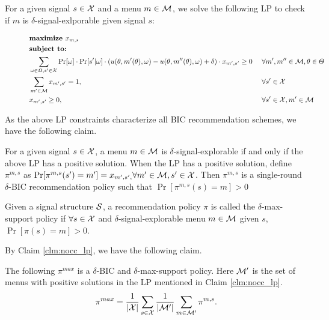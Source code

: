 For a given signal $s \in \X$ and a menu $m \in \M$, we solve the following LP to check if $m$ is $\delta$-signal-exlporable given signal $s$:

\begin{figure}[H]
\begin{mdframed}
\begin{alignat*}{2}
 & \textbf{maximize }    x_{m,s}\  \\
&  \textbf{subject to: }\\
 & \sum_{\omega \in \varOmega, s' \in \X} \Pr[\omega] \cdot \Pr[s' | \omega] \cdot \left(u(\theta, m'(\theta), \omega) - u(\theta, m''(\theta), \omega) + \delta\right) \cdot x_{m',s'} \geq 0  &\ & \forall m',m'' \in \M, \theta \in \varTheta \\
                       & \sum_{m'\in \M} x_{m',s'} = 1,  \ &\ & \forall s' \in \X \\
                       & x_{m',s'} \geq 0,  \ &\ & \forall s' \in \X, m'\in \M \\
\end{alignat*}
\end{mdframed}
\label{fig:nocc_lp}
\end{figure}

As the above LP constraints characterize all BIC recommendation schemes, we have the following claim. 

\begin{claim}
\label{clm:nocc_lp}
For a given signal $s \in \X$, a menu $m \in \M$ is $\delta$-signal-explorable if and only if the above LP has a positive solution. When the LP has a positive solution, define $\pi^{m,s}$ as $\Pr[\pi^{m,s}(s') = m'] = x_{m',s', } \forall m' \in \M, s' \in \X$. Then $\pi^{m,s}$ is a single-round $\delta$-BIC recommendation policy such that $\Pr[\pi^{m,s}(s) = m] > 0$
\end{claim}

\begin{definition}
Given a signal structure $\S$, a recommendation policy $\pi$ is called the $\delta$-max-support policy if $\forall s \in \X$  and $\delta$-signal-explorable menu $m\in \M$ given $s$, $\Pr[\pi(s) = m] > 0$. 
\end{definition}

By Claim \ref{clm:nocc_lp}, we have the following claim.
\begin{claim}
\label{clm:pimax_nocc}
The following $\pi^{max}$ is a $\delta$-BIC and $\delta$-max-support policy. Here $\M'$ is the set of menus with positive solutions in the LP mentioned in Claim \ref{clm:nocc_lp}.
\[
\pi^{max} = \frac{1}{|\X|} \sum_{s \in \X} \frac{1}{|\M'|} \sum_{m \in \M'} \pi^{m,s}.
\]
\end{claim}

